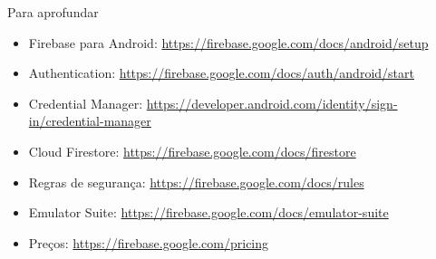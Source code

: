 \documentclass[aspectratio=169,10pt]{beamer}
\begin{document}
\begin{frame}{Para aprofundar}
  \small
  \begin{itemize}
    \item Firebase para Android: \url{https://firebase.google.com/docs/android/setup}
    \item Authentication: \url{https://firebase.google.com/docs/auth/android/start}
    \item Credential Manager: \url{https://developer.android.com/identity/sign-in/credential-manager}
    \item Cloud Firestore: \url{https://firebase.google.com/docs/firestore}
    \item Regras de segurança: \url{https://firebase.google.com/docs/rules}
    \item Emulator Suite: \url{https://firebase.google.com/docs/emulator-suite}
    \item Preços: \url{https://firebase.google.com/pricing}
  \end{itemize}
\end{frame}

\end{document}
